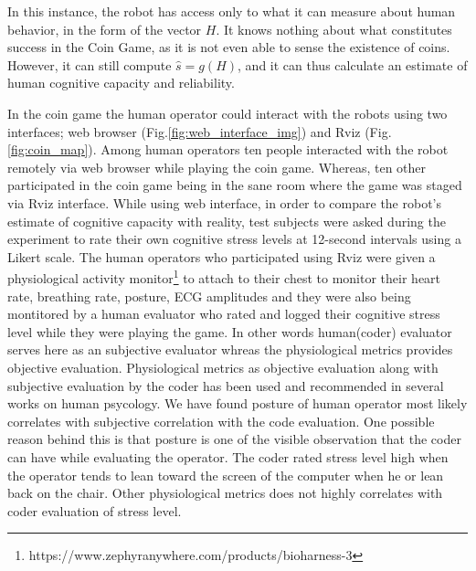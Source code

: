 \documentclass{sig-alternate}
\begin{document}
In this instance, the robot has access only to what it can measure
about human behavior, in the form of the vector $H$.  It knows nothing
about what constitutes success in the Coin Game, as it is not even
able to sense the existence of coins.  However, it can still compute
$\hat{s} = g(H)$, and it can thus calculate an estimate of human
cognitive capacity and reliability.

In the coin game the human operator could interact with the robots using two interfaces; web browser (Fig.\ref{fig:web_interface_img}) and Rviz (Fig.\ref{fig:coin_map}). Among human operators ten people interacted with the robot remotely via web browser while playing the coin game. Whereas, ten other participated in the coin game being in the sane room where the game was staged via Rviz interface.
While using web interface, in order to compare the robot's estimate of cognitive capacity with
reality, test subjects were asked during the experiment to rate their
own cognitive stress levels at 12-second intervals using a Likert
scale. The human operators who participated using Rviz were given a physiological activity monitor\footnote{https://www.zephyranywhere.com/products/bioharness-3} to attach to their chest to monitor their heart rate, breathing rate, posture, ECG amplitudes and they were also being montitored by a human evaluator who rated and logged their cognitive stress level while they were playing the game. In other words human(coder) evaluator serves here as an subjective evaluator whreas the physiological metrics provides objective evaluation. Physiological metrics as objective evaluation along with subjective evaluation by the coder has been used and recommended in several works on human psycology\cite{Brookings1996361, Roscoe1992259}. We have found posture of human operator most likely correlates with subjective correlation with the code evaluation. One possible reason behind this is that posture is one of the visible observation that the coder can have while evaluating the operator. The coder rated stress level high when the operator tends to lean toward the screen of the computer when he or lean back on the chair. Other physiological metrics does not highly correlates with coder evaluation of stress level.
\end{document}
